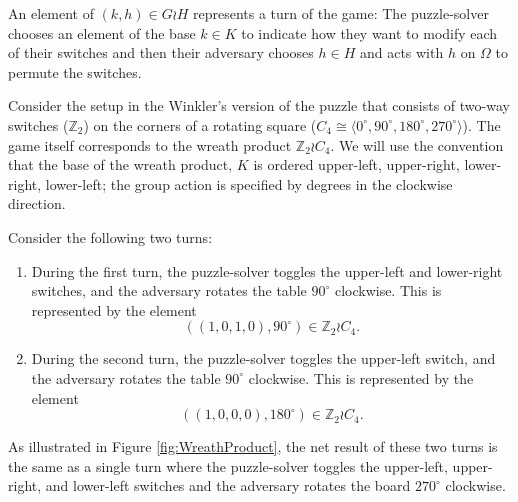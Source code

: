 An element of $(k, h) \in G \wr H$ represents a turn of the game:
The puzzle-solver chooses an element of the base $k \in K$ to indicate
how they want to modify each of their switches
and then their adversary chooses $h \in H$ and acts with $h$ on $\Omega$ to
permute the switches.

\begin{example}
  Consider the setup in the Winkler's version of the puzzle that consists of
  two-way switches ($\mathbb Z_2$) on the corners of a rotating square
  ($C_4 \cong \langle 0^\circ, 90^\circ, 180^\circ, 270^\circ \rangle$).
  The game itself corresponds to the wreath product $\mathbb Z_2 \wr C_4$.
  We will use the convention that the base of the wreath product, $K$ is
  ordered upper-left, upper-right, lower-right, lower-left; the group
  action is specified by degrees in the clockwise direction.

  Consider the following two turns:
  \begin{enumerate}
    \item During the first turn,
    the puzzle-solver toggles the upper-left and lower-right switches, and
    the adversary rotates the table $90^\circ$ clockwise.
    This is represented by the element \[
      ((1,0,1,0), 90^\circ) \in \mathbb Z_2 \wr C_4.
    \]
    \item During the second turn,
    the puzzle-solver toggles the upper-left switch, and
    the adversary rotates the table $90^\circ$ clockwise.
    This is represented by the element \[
      ((1,0,0,0), 180^\circ) \in \mathbb Z_2 \wr C_4.
    \]
  \end{enumerate}
  As illustrated in Figure \ref{fig:WreathProduct},
  the net result of these two turns is the same as
  a single turn where the puzzle-solver toggles the
  upper-left, upper-right, and lower-left
  switches and the adversary rotates the board $270^\circ$ clockwise.

  \begin{figure}
    \center
\end{figure}
\end{example}
